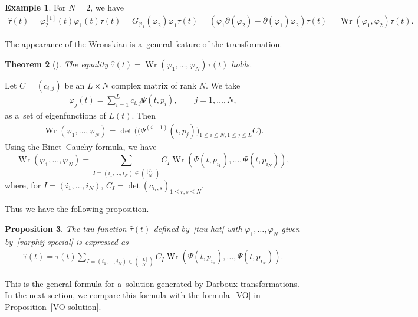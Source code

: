 \documentclass[pdftex]{sigma}
\numberwithin{equation}{section}
\newtheorem{Theorem}{Theorem}[section]
\newtheorem{Proposition}[Theorem]{Proposition}
\theoremstyle{definition}
\newtheorem{Example}[Theorem]{Example}
\begin{document}
\begin{Example}For $N=2$, we have
\begin{gather*}
\widehat{\tau}(t)=\varphi_2^{[1]}(t)\varphi_1(t)\tau(t)=G_{\varphi_1}(\varphi_2)\varphi_1\tau(t)
=(\varphi_1\partial(\varphi_2)-\partial(\varphi_1)\varphi_2)\tau(t)=\operatorname{Wr}(\varphi_1,\varphi_2)\tau(t).
\end{gather*}
\end{Example}

The appearance of the Wronskian is a~general feature of the transformation.

\begin{Theorem}[\cite{H-van-de-Leur2001,Kac-van-de-Leur2018,Kakei,Ovel1993}] The equality
$\widehat{\tau}(t)=\operatorname{Wr}(\varphi_1,\dots ,\varphi_N)\tau(t)$ holds.
\end{Theorem}


Let $C=(c_{i,j})$ be an $L\times N$ complex matrix of rank $N$. We take
\begin{gather}
\varphi_j(t)=\sum_{i=1}^Lc_{i,j}\Psi(t,p_i),
\qquad
j=1,\dots ,N,
\label{varphij-special}
\end{gather}
as a~set of eigenfunctions of $L(t)$.
Then
\begin{gather*}
\operatorname{Wr}(\varphi_1,\dots ,\varphi_N)
=\det\bigl(\bigl(\Psi^{(i-1)}(t,p_j)\bigr)_{1\leq i\leq N,1\leq j\leq L} C\bigr).
\end{gather*}
Using the Binet--Cauchy formula, we have
\[
\operatorname{Wr}(\varphi_1,\dots ,\varphi_N)=\sum_{I=(i_1,\dots ,i_N)\in \binom{[L]}{N}}
C_I \operatorname{Wr}(\Psi(t,p_{i_1}),\dots ,\Psi(t,p_{i_N})),
\label{pre-Darboux}
\]
where, for $I=(i_1,\dots ,i_N)$,
$
C_I=\det(c_{i_r,s})_{1\leq r,s\leq N}$.


Thus we have the following proposition.

\begin{Proposition}\label{Darboux-composition} The tau function $\widehat{\tau}(t)$ defined by~\eqref{tau-hat} with
$\varphi_1,\dots ,\varphi_N$ given by~\eqref{varphij-special} is expressed as
\begin{gather}
\widehat{\tau}(t)=\tau(t)\sum_{I=(i_1,\dots ,i_N)\in \binom{[L]}{N}}
C_I \operatorname{Wr} (\Psi(t,p_{i_1}),\dots ,\Psi(t,p_{i_N}) ).
\label{Darboux}
\end{gather}
\end{Proposition}

This is the general formula for a~solution generated by Darboux transformations.
In the next section, we compare this formula with the formula~\eqref{VO} in
Proposition~\ref{VO-solution}.
\end{document}
